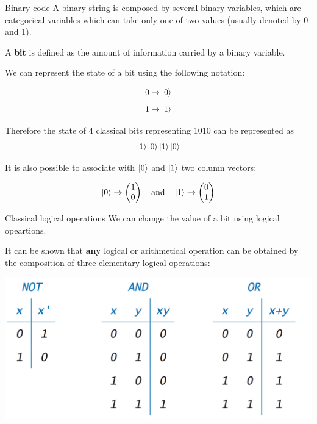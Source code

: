 \documentclass[11p,aspectratio=169]{beamer}
\begin{document}
\begin{frame}{Binary code}
    A binary string is composed by several binary variables, which are categorical
    variables which can take only one of two values (usually denoted by 0 and 1).
    \begin{tcolorbox}
        A \textbf{bit} is defined as the amount of information carried by a binary variable.
    \end{tcolorbox}
    

    We can represent the state of a bit using the following notation:

    $$ 0 \rightarrow \ket{0} $$
    $$ 1 \rightarrow \ket{1} $$

Therefore the state of 4 classical bits representing 1010 can be represented as 
$$ \ket{1} \ket{0} \ket{1} \ket{0} $$

It is also possible to associate with $\ket{0}$ and $\ket{1}$ two column vectors:

$$ \ket{0} \rightarrow \begin{pmatrix}
    1 \\ 
    0
\end{pmatrix}   \quad \text{and} \quad \ket{1} \rightarrow \begin{pmatrix}
    0 \\ 
    1
\end{pmatrix} $$
\end{frame}

\begin{frame}{Classical logical operations}
    We can change the value of a bit using logical opeartions.

    It can be shown that \textbf{any} logical or arithmetical operation can be
    obtained by the composition of three elementary logical operations:

    \includegraphics[width=\textwidth]{figures/truth-table.png}
    
\end{frame}
\end{document}
